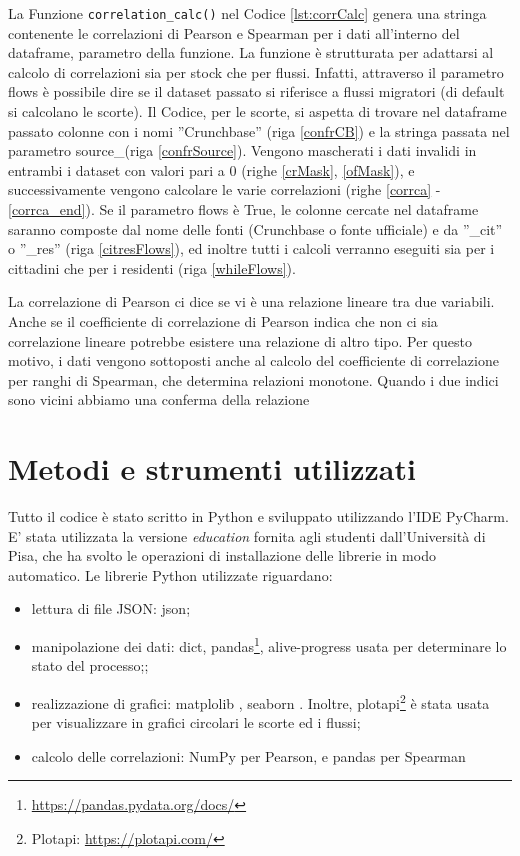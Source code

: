 La Funzione \texttt{correlation\_calc()} nel Codice \ref{lst:corrCalc} genera una stringa contenente le correlazioni di Pearson e Spearman per i dati all'interno del dataframe, parametro della funzione. La funzione è strutturata per adattarsi al calcolo di correlazioni sia per stock che per flussi. Infatti, attraverso il parametro flows è possibile dire se il dataset passato si riferisce a flussi migratori (di default si calcolano le scorte).
Il Codice, per le scorte, si aspetta di trovare nel dataframe passato colonne con i nomi ''Crunchbase'' (riga \ref{confrCB}) e la stringa passata nel parametro source\_(riga \ref{confrSource}). 
Vengono mascherati i dati invalidi in entrambi i dataset con valori pari a 0 (righe \ref{crMask}, \ref{ofMask}), e successivamente vengono calcolare le varie correlazioni (righe \ref{corrca} - \ref{corrca_end}). Se il parametro flows è True, le colonne cercate nel dataframe saranno composte dal nome delle fonti (Crunchbase o fonte ufficiale) e da ''\_cit'' o ''\_res'' (riga \ref{citresFlows}), ed inoltre tutti i calcoli verranno eseguiti sia per i cittadini che per i residenti (riga \ref{whileFlows}).

La correlazione di Pearson ci dice se vi è una relazione lineare tra due variabili. Anche se il coefficiente di correlazione di Pearson indica che non ci sia correlazione lineare potrebbe esistere una relazione di altro tipo. Per questo motivo, i dati vengono sottoposti anche al calcolo del coefficiente di correlazione per ranghi di Spearman, che determina relazioni monotone. Quando i due indici sono vicini abbiamo una conferma della relazione


\section{Metodi e strumenti utilizzati}
\label{strumentiutilizzati}
Tutto il codice è stato scritto in Python e sviluppato utilizzando l'IDE PyCharm. E' stata utilizzata la versione \textit{education} fornita agli studenti dall'Università di Pisa, che ha svolto le operazioni di installazione delle librerie in modo automatico. 
Le librerie Python utilizzate riguardano:
\begin{itemize}
\item lettura di file JSON: json; 
\item manipolazione dei dati: dict, pandas\footnote{\url{https://pandas.pydata.org/docs/}}, alive-progress \cite{rsalmei} usata per determinare lo stato del processo;;
\item realizzazione di grafici: matplolib \cite{Hunter:2007}, seaborn \cite{Waskom2021}. Inoltre, plotapi\footnote{Plotapi: \url{https://plotapi.com/}} è stata usata per visualizzare in grafici circolari le scorte ed i flussi; 
\item calcolo delle correlazioni: NumPy \cite{harris2020array} per Pearson, e pandas per Spearman
\end{itemize}

